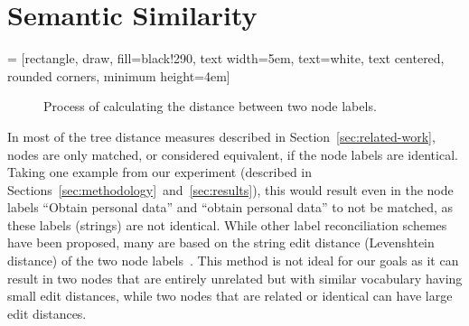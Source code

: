 \section{Semantic Similarity}
\label{sec:semantic-similarity}


 = [rectangle, draw, fill=black!290,
text width=5em, text=white,  text centered, rounded corners, minimum height=4em]
\begin{figure*}
    \centering
    \caption{Process of calculating the distance between two node labels.}
    \label{fig:semanticreplacement}
\end{figure*}

In most of the tree distance measures described in Section~\ref{sec:related-work}, nodes are only matched, or considered equivalent, if the node labels are identical. Taking one example from our experiment (described in Sections~\ref{sec:methodology}~and~\ref{sec:results}), this would result even in the node labels ``Obtain personal data'' and ``obtain personal data'' to not be matched, as these labels (strings) are not identical. While other label reconciliation schemes have been proposed, many are based on the string edit distance (Levenshtein distance) of the two node labels~\cite{levenshtein1966binary}. This method is not ideal for our goals as it can result in two nodes that are entirely unrelated but with similar vocabulary having small edit distances, while two nodes that are related or identical can have large edit distances. 

